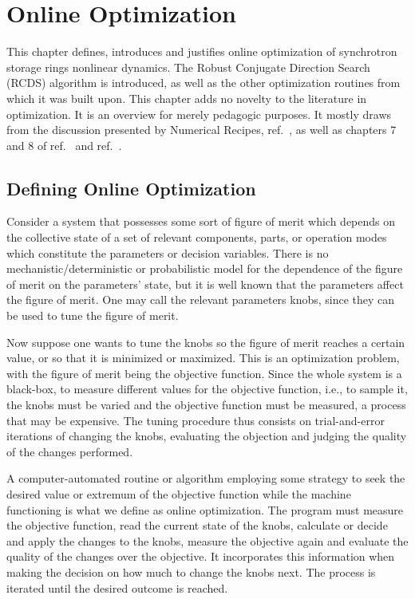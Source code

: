 \chapter{Online Optimization}
This chapter defines, introduces and justifies online optimization  of synchrotron storage rings nonlinear dynamics. The Robust Conjugate Direction Search (RCDS) algorithm is introduced, as well as the other optimization routines from which it was built upon. This chapter adds no novelty to the literature in optimization. It is an overview for merely pedagogic purposes. It mostly draws from the discussion presented by Numerical Recipes, ref.~\cite{press_numerical_2007}, as well as chapters 7 and 8 of ref.~\cite{huang_beam-based_2019} and ref.~\cite{huang_algorithm_2013}.
\section{Defining Online Optimization}
Consider a system that possesses some sort of figure of merit which depends on the collective state of a set of relevant components, parts, or operation modes which constitute the  parameters or decision variables. There is no mechanistic/deterministic or probabilistic model for the dependence of the figure of merit on the parameters' state, but it is well known that the parameters affect the figure of merit. One may call the relevant parameters knobs, since they can be used to tune the figure of merit.

Now suppose one wants to tune the knobs so the figure of merit reaches a certain value, or so that it is minimized or maximized. This is an optimization problem, with the figure of merit being the objective function. Since the whole system is a black-box, to measure different values for the objective function, i.e., to sample it, the knobs must be varied and the objective function must be measured, a process that may be expensive. The tuning procedure thus consists on trial-and-error iterations of changing the knobs, evaluating the objection and judging the quality of the changes performed.

A computer-automated routine or algorithm employing some strategy to seek the desired value or extremum of the objective function while the machine functioning is what we define as online optimization. The program must measure the objective function, read the current state of the knobs, calculate or decide and apply the changes to the knobs, measure the objective again and evaluate the quality of the changes over the objective. It incorporates this information when making the decision on how much to change the knobs next. The process is iterated until the desired outcome is reached.

